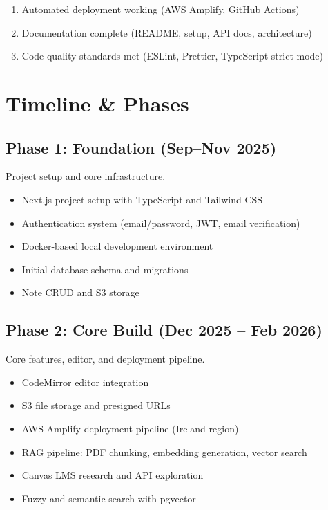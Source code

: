 \documentclass[12pt,a4paper]{article}
\begin{document}
\begin{enumerate}
    \item Automated deployment working (AWS Amplify, GitHub Actions)

    \item Documentation complete (README, setup, API docs, architecture)

    \item Code quality standards met (ESLint, Prettier, TypeScript strict mode)
\end{enumerate}

\section{Timeline \& Phases}

\subsection{Phase 1: Foundation (Sep--Nov 2025)}

Project setup and core infrastructure.

\begin{itemize}
    \item Next.js project setup with TypeScript and Tailwind CSS
    \item Authentication system (email/password, JWT, email verification)
    \item Docker-based local development environment
    \item Initial database schema and migrations
    \item Note CRUD and S3 storage
\end{itemize}

\subsection{Phase 2: Core Build (Dec 2025 -- Feb 2026)}

Core features, editor, and deployment pipeline.

\begin{itemize}
    \item CodeMirror editor integration
    \item S3 file storage and presigned URLs
    \item AWS Amplify deployment pipeline (Ireland region)
    \item RAG pipeline: PDF chunking, embedding generation, vector search
    \item Canvas LMS research and API exploration
    \item Fuzzy and semantic search with pgvector
\end{itemize}
\end{document}
